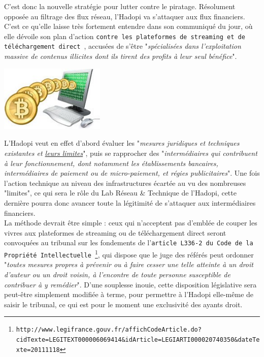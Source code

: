 \documentclass[11pt,twoside,a4paper]{article}
\begin{document}
\begin{minipage}[ht]{14.00cm}
	C'est donc la nouvelle strat{\'e}gie pour lutter contre le piratage. R{\'e}solument oppos{\'e}e au filtrage des flux r{\'e}seau, l'Hadopi va s'attaquer aux flux financiers. C'est ce qu'elle laisse tr{\`e}s fortement entendre dans son communiqu{\'e} du jour, o{\`u} elle d{\'e}voile son plan d'action \texttt{contre les plateformes de streaming et de t{\'e}l{\'e}chargement direct~\footnotemark}, accus{\'e}es de s'{\^e}tre "\emph{sp{\'e}cialis{\'e}es dans l'exploitation massive de contenus illicites dont ils tirent des profits {\`a} leur seul b{\'e}n{\'e}fice}". ~\\ 
\end{minipage} \hfill \begin{minipage}[ht]{5.25cm}
	\includegraphics[width=5.00cm]{img/monnaie-electronique.jpg}
\end{minipage}

L'Hadopi veut en effet d'abord {\'e}valuer les "\emph{mesures juridiques et techniques existantes et \underline{leurs limites}}", puis se rapprocher des "\emph{interm{\'e}diaires qui contribuent {\`a} leur fonctionnement, dont notamment les {\'e}tablissements bancaires, interm{\'e}diaires de paiement ou de micro-paiement, et r{\'e}gies publicitaires}". Une fois l'action technique au niveau des infrastructures {\'e}cart{\'e}e au vu des nombreuses "limites", ce qui sera le r{\^o}le du Lab R{\'e}seau \& Technique de l'Hadopi, cette derni{\`e}re pourra donc avancer toute la l{\'e}gitimit{\'e} de s'attaquer aux interm{\'e}diaires financiers. ~\\

La m{\'e}thode devrait {\^e}tre simple : ceux qui n'acceptent pas d'embl{\'e}e de couper les vivres aux plateformes de streaming ou de t{\'e}l{\'e}chargement direct seront convoqu{\'e}es au tribunal sur les fondements de l'\texttt{article L336-2 du Code de la Propri{\'e}t{\'e} Intellectuelle~\footnote{\texttt{http://www.legifrance.gouv.fr/affichCodeArticle.do?cidTexte=LEGITEXT000006069414\&idArticle=LEGIARTI000020740350\&dateTexte=20111118}}}, qui dispose que le juge des r{\'e}f{\'e}r{\'e}s peut ordonner "\emph{toutes mesures propres {\`a} pr{\'e}venir ou {\`a} faire cesser une telle atteinte {\`a} un droit d'auteur ou un droit voisin, {\`a} l'encontre de toute personne susceptible de contribuer {\`a} y rem{\'e}dier}". D'une souplesse inouie, cette disposition l{\'e}gislative sera peut-{\^e}tre simplement modifi{\'e}e {\`a} terme, pour permettre {\`a} l'Hadopi elle-m{\^e}me de saisir le tribunal, ce qui est pour le moment une exclusivit{\'e} des ayants droit. ~\\
\end{document}
